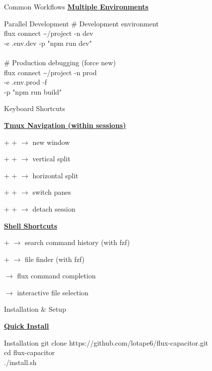 \documentclass[10pt,a4paper]{article}
\begin{document}
\begin{multicols}{3}
\begin{textbox}{Common Workflows}
\underline{\textbf{Multiple Environments}}

\begin{simplecodebox}{Parallel Development}
\# Development environment\\
flux connect \textasciitilde/project -n dev \\
\phantom{xx}-e .env.dev -p "npm run dev"\\
\\
\# Production debugging (force new)\\
flux connect \textasciitilde/project -n prod \\
\phantom{xx}-e .env.prod -f \\
\phantom{xx}-p "npm run build"\\
\end{simplecodebox}

\end{textbox}

\begin{textbox}{Keyboard Shortcuts}

\underline{\textbf{Tmux Navigation (within sessions)}}

 +  +  $\rightarrow$ new window

 +  + \keystroke{\%} $\rightarrow$ vertical split

 +  +  $\rightarrow$ horizontal split

 +  +  $\rightarrow$ switch panes

 +  +  $\rightarrow$ detach session

\underline{\textbf{Shell Shortcuts}}

 +  $\rightarrow$ search command history (with fzf)

 +  $\rightarrow$ file finder (with fzf)

 $\rightarrow$ flux command completion

  $\rightarrow$ interactive file selection

\end{textbox}

\begin{textbox}{Installation \& Setup}

\underline{\textbf{Quick Install}}

\begin{simplecodebox}{Installation}
git clone https://github.com/lotape6/flux-capacitor.git\\
cd flux-capacitor\\
./install.sh\\
\end{simplecodebox}


\end{textbox}
\end{multicols}
\end{document}
